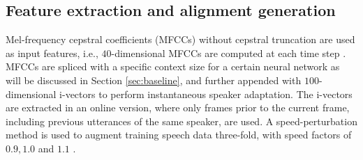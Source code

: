 \documentclass[a4paper]{article}
\begin{document}
\subsection{Feature extraction and alignment generation}

Mel-frequency cepstral coefficients (MFCCs) without cepstral truncation are used as input features, i.e., $40$-dimensional MFCCs are computed at each time step \cite{povey2014parallel}. MFCCs are spliced with a specific  context size for a certain neural network as will be discussed in Section \ref{sec:baseline}, and further appended with $100$-dimensional i-vectors  to perform instantaneous speaker adaptation. The i-vectors are extracted in an online version,
where only frames prior to the current frame, including previous utterances of the same speaker, are used.
A speed-perturbation method is used to augment training speech data three-fold, with speed factors of $0.9,1.0$ and $1.1$ \cite{ko2015audio}.

\end{document}
